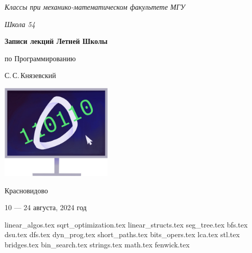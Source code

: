 \documentclass[a5paper, 10pt, twoside]{article}
\begin{document}
\begin{titlepage}
    \centering
    \vspace*{\fill}
    
    {\sl\large Классы при механико-математическом факультете МГУ} \medskip

    {\sl\large Школа 54}

    \vspace*{4cm}

    \begin{spacing}{1}
        \LARGE\bfseries Записи лекций Летней Школы\par по Программированию
    \end{spacing}
    \smallskip
    
    {\Large С.\,С.\,Князевский}
    \vspace{.6cm}
    
    \includegraphics[width=0.4\textwidth]{img/logo.jpg}

    \vspace*{4cm}

    {\large Красновидово}\medskip
    
    {\large 10 --- 24 августа, 2024 год}
    \vspace*{\fill}
\end{titlepage}

\tableofcontents
\newpage

{linear_algos.tex}
{sqrt_optimization.tex}
{linear_structs.tex}
{seg_tree.tex}
{bfs.tex}
{dsu.tex}
{dfs.tex}
{dyn_prog.tex}
{short_paths.tex}
{bits_opers.tex}
{lca.tex}
{stl.tex}
{bridges.tex}
{bin_search.tex}
{strings.tex}
{math.tex}
{fenwick.tex}
\end{document}
